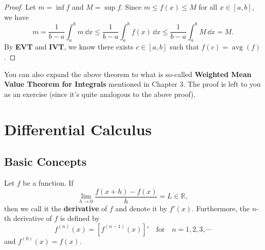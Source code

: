\documentclass[a4paper]{ctexart}
\begin{document}
	\begin{proof}
		Let $m=\inf f$ and $M=\sup f$. Since $m\le f(x) \le M$ for all $x\in [a,b]$, we have
		\[
		m=\frac{1}{b-a}\int_a^b m\, \dd x \le \frac{1}{b-a}\int_a^b f(x)\, \dd x \le \frac{1}{b-a}\int_a^b M\, \dd x = M.
		\]
		By \textbf{EVT} and \textbf{IVT}, we know there exists $c\in [a,b]$ such that $f(c)=\operatorname{avg}(f)$.
	\end{proof}
    \begin{myrmk}
        You can also expand the above theorem to what is so-called \textbf{Weighted Mean Value Theorem for Integrals} mentioned in Chapter 3. The proof is left to you as an exercise (since it's quite analogous to the above proof).
    \end{myrmk}
	\newpage
	\section{Differential Calculus}
	\subsection{Basic Concepts}
	\begin{mydef}
		Let $f$ be a function. If
		\[
		\lim _{h\to 0} \frac{f(x+h)-f(x)}{h}=L \in \mathbb{R},
		\]
		then we call it the \textbf{derivative} of $f$ and denote it by	$f'(x)$. Furthermore, the $n$-th derivative of $f$ is defined by
		\[
		f^{(n)}(x)= \left[f^{(n-1)}(x)\right]' \quad \text{for}\quad n=1,2,3,\cdots
		\]
		and $f^{(0)}(x)=f(x)$.
	\end{mydef}
\end{document}
